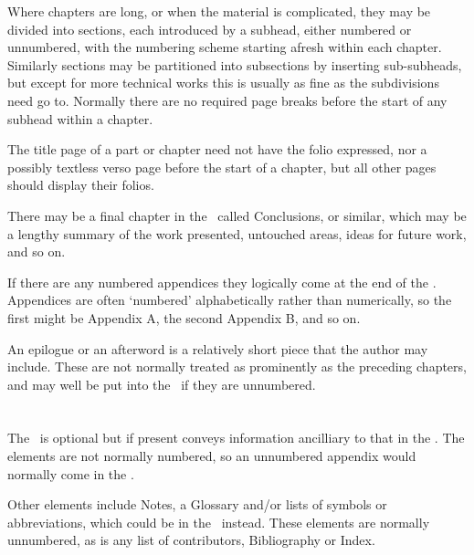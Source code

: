 \documentclass[10pt,letterpaper,extrafontsizes]{memoir}
\begin{document}
    Where chapters are long, or when the material is
complicated, they may be divided into sections, each introduced
by a subhead, either numbered or unnumbered, with
the numbering scheme starting afresh within each chapter. Similarly sections
may be partitioned into subsections by inserting sub-subheads, but except 
for more technical works this is usually as fine as the subdivisions need 
go to. Normally there are no required page breaks before the start of any 
subhead within a chapter.

    The title page of a part
 or chapter need not have the folio expressed, nor
a possibly textless verso page before the start of a chapter, but all other 
pages should display their folios.

    There may be a final chapter in the \pixmainmatter\ called Conclusions, 
or similar, which may be a lengthy summary of the work presented, untouched
areas, ideas for future work, and so on.

    If there are any numbered appendices 
they logically come at the end of
the \pixmainmatter. Appendices are often `numbered' alphabetically rather
than numerically, so the first might be Appendix A, the second Appendix B,
and so on.

    An epilogue or an afterword is a 
relatively short piece that the author may
include. These are not normally treated as prominently as the preceding
chapters, and may well be put into the \pixbackmatter\ if they are 
unnumbered.

\section{\prBackmatter}

    The \pixbackmatter\
is optional but if present conveys information ancilliary
to that in the \pixmainmatter. The elements are not normally numbered, so an
unnumbered appendix\index{appendix} would normally come in the \pixbackmatter.

    Other elements include Notes, a Glossary
 and/or lists of symbols or 
abbreviations, which could be in the 
\pixfrontmatter\ instead. These elements 
are normally unnumbered, as is any list of contributors, 
Bibliography\index{bibliography} or Index\index{index}.
\end{document}
